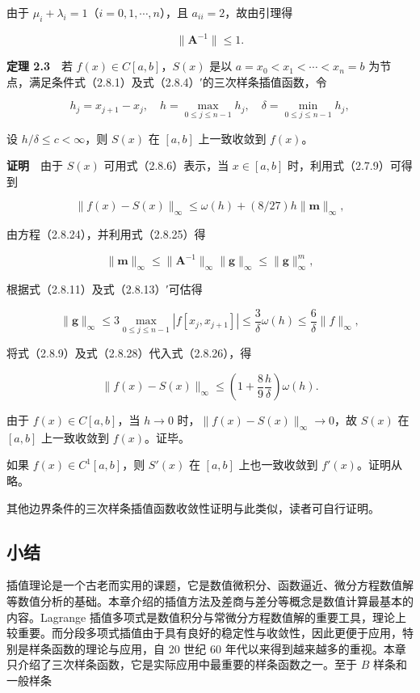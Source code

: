 由于 \(\mu_i+\lambda_i=1\)（\(i=0,1,\cdots,n\)），且 \(a_{ii}=2\)，故由引理得

\[\|\boldsymbol A^{-1}\|\leqslant1.\tag{2.8.25}\]

\textbf{定理 2.3}　若 \(f(x)\in C[a,b]\)，\(S(x)\) 是以 \(a=x_0<x_1<\cdots<x_n=b\) 为节点，满足条件式（2.8.1）及式（2.8.4）′的三次样条插值函数，令

\[h_j=x_{j+1}-x_j,\quad h=\max_{0\leqslant j\leqslant n-1}h_j,\quad\delta=\min_{0\leqslant j\leqslant n-1}h_j,\]

设 \(h/\delta\leqslant c<\infty\)，则 \(S(x)\) 在 \([a,b]\) 上一致收敛到 \(f(x)\)。

\textbf{证明}　由于 \(S(x)\) 可用式（2.8.6）表示，当 \(x\in[a,b]\) 时，利用式（2.7.9）可得到

\[\|f(x)-S(x)\|_\infty\leqslant\omega(h)+(8/27)h\|\boldsymbol m\|_\infty,\tag{2.8.26}\]

由方程（2.8.24），并利用式（2.8.25）得

\[\|\boldsymbol m\|_\infty\leqslant\|\boldsymbol A^{-1}\|_\infty\|\boldsymbol g\|_\infty\leqslant\|\boldsymbol g\|_\infty^m,\tag{2.8.27}\]

根据式（2.8.11）及式（2.8.13）′可估得

\[\|\boldsymbol g\|_\infty\leqslant3\max_{0\leqslant j\leqslant n-1}|f[x_j,x_{j+1}]|\leqslant\frac3\delta\omega(h)\leqslant\frac6\delta\|f\|_\infty,\tag{2.8.28}\]

将式（2.8.9）及式（2.8.28）代入式（2.8.26），得

\[\|f(x)-S(x)\|_\infty\leqslant\left(1+\frac89\frac h\delta\right)\omega(h).\]

由于 \(f(x)\in C[a,b]\)，当 \(h\to0\) 时，\(\|f(x)-S(x)\|_\infty\to0\)，故 \(S(x)\) 在 \([a,b]\) 上一致收敛到 \(f(x)\)。证毕。

如果 \(f(x)\in C^1[a,b]\)，则 \(S'(x)\) 在 \([a,b]\) 上也一致收敛到 \(f'(x)\)。证明从略。

其他边界条件的三次样条插值函数收敛性证明与此类似，读者可自行证明。

\subsection{小结}\label{ch02b-ux5c0fux7ed3}

插值理论是一个古老而实用的课题，它是数值微积分、函数逼近、微分方程数值解等数值分析的基础。本章介绍的插值方法及差商与差分等概念是数值计算最基本的内容。Lagrange 插值多项式是数值积分与常微分方程数值解的重要工具，理论上较重要。而分段多项式插值由于具有良好的稳定性与收敛性，因此更便于应用，特别是样条函数的理论与应用，自 20 世纪 60 年代以来得到越来越多的重视。本章只介绍了三次样条函数，它是实际应用中最重要的样条函数之一。至于 \(B\) 样条和一般样条

